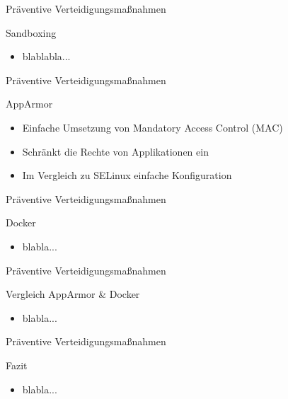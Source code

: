 \begin{frame}{Präventive Verteidigungsmaßnahmen}
        \begin{block}{Sandboxing}
                \begin{itemize}
                        \item blablabla... 
                \end{itemize}
        \end{block}
\end{frame}

\begin{frame}{Präventive Verteidigungsmaßnahmen}
        \begin{block}{AppArmor}
                \begin{itemize}
                        \item Einfache Umsetzung von Mandatory Access Control (MAC)
                        \pause
                        \item Schränkt die Rechte von Applikationen ein
                        \pause
                        \item Im Vergleich zu SELinux einfache Konfiguration
                \end{itemize}
        \end{block}
\end{frame}

\begin{frame}{Präventive Verteidigungsmaßnahmen}
        \begin{block}{Docker}
                \begin{itemize}
                        \item blabla...
                \end{itemize}
        \end{block}
\end{frame}

\begin{frame}{Präventive Verteidigungsmaßnahmen}
        \begin{block}{Vergleich AppArmor \& Docker}
                \begin{itemize}
                        \item blabla... 
                \end{itemize}
        \end{block}
\end{frame}

\begin{frame}{Präventive Verteidigungsmaßnahmen}
        \begin{block}{Fazit}
                \begin{itemize}
                        \item blabla... 
                \end{itemize}
        \end{block}
\end{frame}

